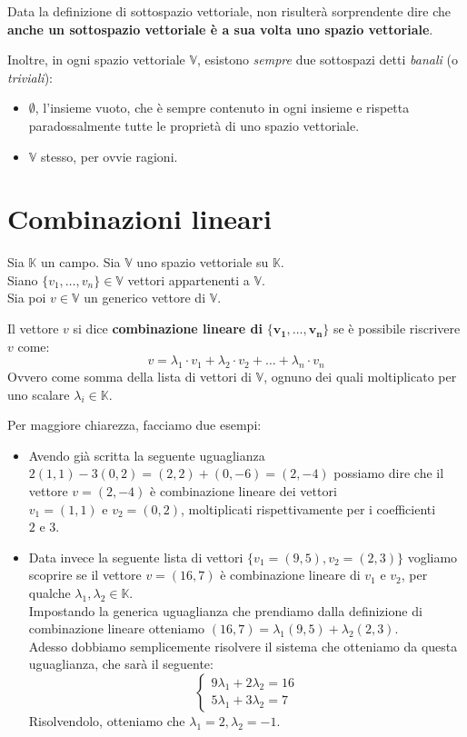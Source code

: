 \documentclass[12pt]{report}
\newcommand{\K}{\mathbb{K}}
\newcommand{\V}{\mathbb{V}}
\newcommand{\vectors}[1]{#1_1, \dots, #1_n}
\begin{document}
	Data la definizione di sottospazio vettoriale, non risulterà sorprendente dire che \textbf{anche un sottospazio vettoriale è a sua volta uno spazio vettoriale}.
	
	Inoltre, in ogni spazio vettoriale $\V$, esistono \textit{sempre} due sottospazi detti \textit{banali} (o \textit{triviali}):
	\begin{itemize}
		\item $\emptyset$, l'insieme vuoto, che è sempre contenuto in ogni insieme e rispetta paradossalmente tutte le proprietà di uno spazio vettoriale.
		\item $\V$ stesso, per ovvie ragioni.
	\end{itemize}	
	
	\section{Combinazioni lineari}
	Sia $\K$ un campo. Sia $\V$ uno spazio vettoriale su $\K$.\\
	Siano $\{\vectors{v}\} \in \V$ vettori appartenenti a $\V$.\\
	Sia poi $v \in \V$ un generico vettore di $\V$.
	
	Il vettore $v$ si dice \textbf{combinazione lineare di} $\mathbf{\{\vectors{v}\}}$ se è possibile riscrivere $v$ come:
	\[
		v = \lambda_1 \cdot v_1 + \lambda_2 \cdot v_2 + \dots + \lambda_n \cdot v_n
	\]
	Ovvero come somma della lista di vettori di $\V$, ognuno dei quali moltiplicato per uno scalare $\lambda_i \in \K$.
	
	Per maggiore chiarezza, facciamo due esempi:
	\begin{itemize}
		\item Avendo già scritta la seguente uguaglianza $2(1, 1) - 3(0, 2) = (2, 2) + (0, -6) = (2, -4)$ possiamo dire che il vettore $v = (2, -4)$ è combinazione lineare dei vettori $v_1 = (1, 1) \text{ e } v_2 = (0, 2)$, moltiplicati rispettivamente per i coefficienti $2 \text{ e } 3$.
		\item Data invece la seguente lista di vettori $\{v_1 = (9, 5), v_2 = (2, 3)\}$ vogliamo scoprire se il vettore $v = (16, 7)$ è combinazione lineare di $v_1 \text{ e } v_2$, per qualche $\lambda_1, \lambda_2 \in \K$. \\
		Impostando la generica uguaglianza che prendiamo dalla definizione di combinazione lineare otteniamo $(16, 7) = \lambda_1(9,5) + \lambda_2(2, 3)$.\\
		Adesso dobbiamo semplicemente risolvere il sistema che otteniamo da questa uguaglianza, che sarà il seguente:
		\[
			\begin{cases}
				9\lambda_1 + 2\lambda_2 = 16\\
				5\lambda_1 + 3\lambda_2 = 7
			\end{cases}
		\]
		Risolvendolo, otteniamo che $\lambda_1 = 2, \lambda_2 = -1$.
	\end{itemize}
	
\end{document}
